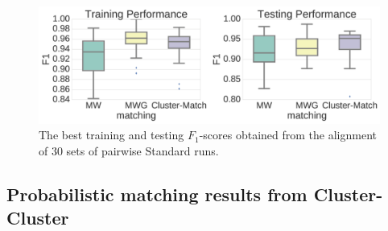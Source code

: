 \begin{figure}[!htbp]
\centering\includegraphics[width=1.0\linewidth]{05-precursor-cluster/figures/fig3.pdf}
\centering\caption{\label{fig:03} The best training and testing $F_1$-scores obtained from the alignment of 30 sets of pairwise Standard runs.}
\end{figure}


\subsection{Probabilistic matching results from Cluster-Cluster}

